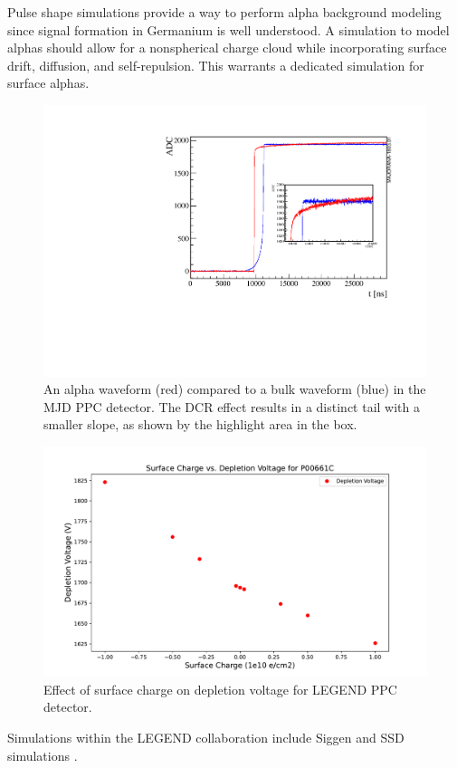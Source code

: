   
Pulse shape simulations provide a way to perform alpha background modeling since signal formation in Germanium is well understood. A simulation to model alphas should allow for a nonspherical charge cloud while incorporating surface drift, diffusion, and self-repulsion. This warrants a dedicated simulation for surface alphas.




  \begin{figure}[!htb]
\centering
  \includegraphics[width=0.95\linewidth]{ch3/figs/dcr_waveform.pdf}
 \caption{An alpha waveform (red) compared to a bulk waveform (blue) in the MJD PPC detector. The DCR effect results in a distinct tail with a smaller slope, as shown by the highlight area in the box.\cite{tube_paper}}
\label{fig:dcr_waveform}
  \end{figure}


\begin{figure}[!htb]
\centering
  \includegraphics[width=0.99\linewidth]{ch3/figs/deplep_sc.pdf}
 \caption{Effect of surface charge on depletion voltage for LEGEND PPC detector.}
\label{ch3:fig:deplection_sc}
  \end{figure}
Simulations within the LEGEND collaboration include Siggen \cite{siggen_paper} and SSD simulations \cite{Abt:2021SSD}.

